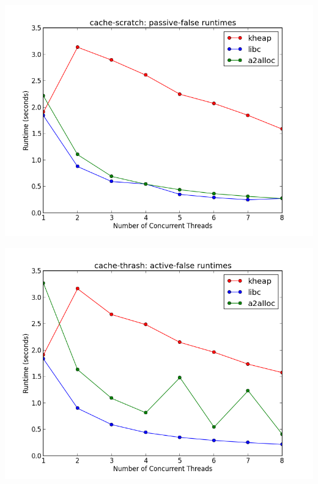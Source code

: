 \documentclass[a4paper, 12pt]{article}
\begin{document}
\vfill
\begin{center}
	\includegraphics[width=6.0 in]{cache-scratch.png}
\end{center}
\vfill

\vfill
\begin{center}
	\includegraphics[width=6.0 in]{cache-thrash.png}
\end{center}
\vfill
\end{document}
